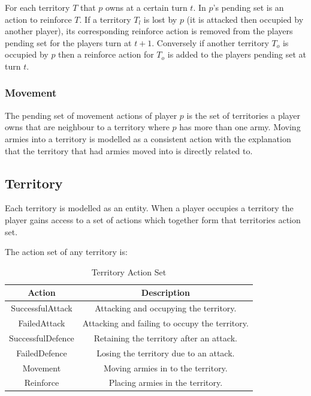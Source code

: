\documentclass[parskip]{cs4rep}
\begin{document}
For each territory $T$ that $p$ owns at a certain turn $t$. In $p$'s pending set is an action to reinforce $T$. If a territory $T_{l}$ is lost by $p$ (it is attacked then occupied by another player), its corresponding reinforce action is removed from the players pending set for the players turn at $t+1$. Conversely if another territory $T_{o}$ is occupied by $p$ then a reinforce action for $T_{o}$ is added to the players pending set at turn $t$.

\subsubsection{Movement}

The pending set of movement actions of player $p$ is the set of territories a player owns that are neighbour to a territory where $p$ has more than one army. Moving armies into a territory is modelled as a consistent action with the explanation that the territory that had armies moved into is directly related to.

\subsection{Territory}

Each territory is modelled as an entity. When a player occupies a territory the player gains access to a set of actions which together form that territories action set.

The action set of any territory is:

\begin{table}[ht]
\centering
\begin{tabular}{|c|c|}
\hline 
\textbf{Action} & \textbf{Description} \\ 
\hline 
SuccessfulAttack & Attacking and occupying the territory.\\ 
\hline 
FailedAttack & Attacking and failing to occupy the territory.\\ 
\hline 
SuccessfulDefence & Retaining the territory after an attack.\\ 
\hline 
FailedDefence & Losing the territory due to an attack.\\
\hline
Movement & Moving armies in to the territory.\\
\hline  
Reinforce & Placing armies in the territory.\\
\hline 
\end{tabular}
\caption{Territory Action Set}
\label{table:continent-bonus}
\end{table}
\end{document}
